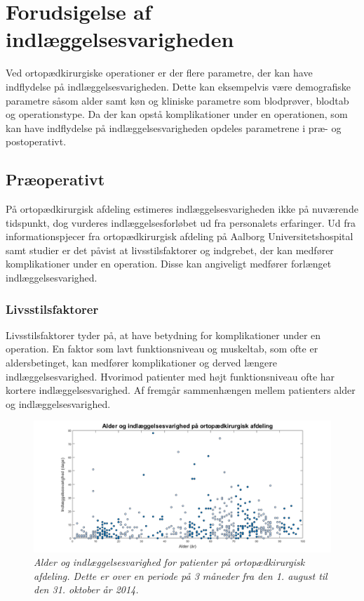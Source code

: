 \section{Forudsigelse af indlæggelsesvarigheden}
Ved ortopædkirurgiske operationer er der flere parametre, der kan have indflydelse på indlæggelsesvarigheden. Dette kan eksempelvis være demografiske parametre såsom alder samt køn og kliniske parametre som blodprøver, blodtab og operationstype. Da der kan opstå komplikationer under en operationen, som kan have indflydelse på indlæggelsesvarigheden opdeles parametrene i præ- og postoperativt.


\subsection{Præoperativt}
På ortopædkirurgisk afdeling estimeres indlæggelsesvarigheden ikke på nuværende tidspunkt, dog vurderes indlæggelsesforløbet ud fra personalets erfaringer. Ud fra informationspjecer fra ortopædkirurgisk afdeling på Aalborg Universitetshospital samt studier er det påvist at livsstilsfaktorer og indgrebet, der kan medfører komplikationer under en operation. Disse kan angiveligt medfører forlænget indlæggelsesvarighed. 


\subsubsection{Livsstilsfaktorer}
Livsstilsfaktorer tyder på, at have betydning for komplikationer under en operation. En faktor som lavt funktionsniveau og muskeltab, som ofte er aldersbetinget, kan medfører komplikationer og derved længere indlæggelsesvarighed. Hvorimod patienter med højt funktionsniveau ofte har kortere indlæggelsesvarighed.\cite{Kehlet2001, Janssen2002} Af  fremgår sammenhængen mellem patienters alder og indlæggelsesvarighed. 


\begin{figure}[H]
	\centering
	\includegraphics[scale=0.5]{figures/alderogindlaeg}
	\caption{\textit{Alder og indlæggelsesvarighed for patienter på ortopædkirurgisk afdeling. Dette er over en periode på 3 måneder fra den 1. august til den 31. oktober år 2014.}}
	\label{alderogindlaeggelse}
\end{figure}


